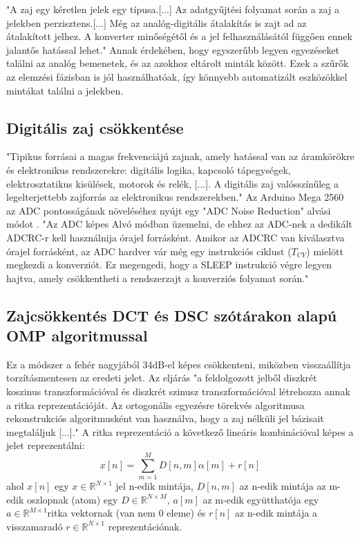 "A zaj egy kéretlen jelek egy típusa.[...] Az adatgyűjtési folyamat során a zaj a jelekben perzisztens.[...] 
Még az analóg-digitális átalakítás is zajt ad az átalakított jelhez. 
A konverter minőségétől és a jel felhasználásától függően ennek jalantős hatással lehet."\cite{noise_reduction_omp}
Annak érdekében, hogy egyszerűbb legyen egyezéseket találni az analóg bemenetek, és az azokhoz eltárolt minták között.
Ezek a szűrők az elemzési fázisban is jól használhatóak, így könnyebb automatizált eszközökkel mintákat találni a jelekben.

\subsection{Digitális zaj csökkentése} \label{ADC_noise}
"Tipikus forrásai a magas frekvenciájú zajnak, amely hatással van az áramkörökre és elektronikus rendszerekre: digitális logika, kapcsoló tápegységek, elektrosztatikus kisülések, motorok és relék, [...]. 
A digitális zaj valósszínűleg a legelterjettebb zajforrás az elektronikus rendszerekben."\cite{smith1992high}
Az Arduino Mega 2560 az ADC pontosságának növeléséhez nyújt egy "ADC Noise Reduction" alvási módot \cite{arduino_at_mega_datasheet}. 
"Az ADC képes Alvó módban üzemelni, de ehhez az ADC-nek a dedikált ADCRC-r kell használnija órajel forrásként. 
Amikor az ADCRC van kiválasztva órajel forrásként, az ADC hardver vár még egy instrukciós ciklust ($T_{CY}$) mielött megkezdi a konverziót. 
Ez megengedi, hogy a SLEEP instrukció végre legyen hajtva, amely csökkentheti a rendszerzajt a konverziós folyamat során."\cite{ATmega_processor_datasheet}

\subsection{Zajcsökkentés DCT és DSC szótárakon alapú OMP algoritmussal} \label{OMP}

Ez a módszer a fehér nagyjából 34dB-el képes csökkenteni, miközben visszaállítja torzításmentesen az eredeti jelet.\cite{noise_reduction_omp}
Az eljárás "a feldolgozott jelből diszkrét koszinus transzformációval és diszkrét szinusz transzformációval létrehozza annak a ritka reprezentációját. Az ortogonális egyezésre törekvés algoritmusa rekonstrukciós algoritmusként van használva, hogy a zaj nélküli jel bázisait megtaláljuk [...]."\cite{noise_reduction_omp}
A ritka reprezentáció a következő lineáris kombinációval képes a jelet reprezentálni:
\[x[n]=\sum_{m=1}^{M}D[n,m]\alpha[m]+r[n]\]
ahol $x[n]$ egy $x \in \mathbb{R}^{N \times 1}$ jel n-edik mintája, $D[n,m]$ az n-edik mintája az m-edik oszlopnak (atom) egy $D \in \mathbb{R}^{N \times M}$, $a[m]$ az m-edik együtthatója egy $a \in \mathbb{R}^{M \times 1}$ritka vektornak (van nem 0 eleme) és $r[n]$ az n-edik mintája a visszamaradó $r \in \mathbb{R}^{N \times 1}$ reprezentációnak.\cite{noise_reduction_omp}

